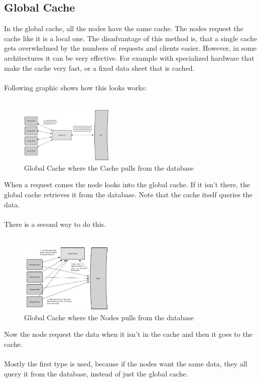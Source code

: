 \documentclass[12p]{article}
\begin{document}
	\subsection{Global Cache}
	In the global cache, all the nodes have the same cache. The nodes request the cache like it is a local one. The disadvantage of this method is, that a single cache gets overwhelmed by the numbers of requests and clients easier. However, in some architectures it can be very effective. For example with specialized hardware that make the cache very fast, or a fixed data sheet that is cached. \\\\
	Following graphic shows how this looks works: \\\\
	\begin{figure}[h!]
		\centering
		\includegraphics[width=0.4\textwidth]{img/global}
		\caption{Global Cache where the Cache pulls from the database \cite{cache}}
	\end{figure}
	When a request comes the node looks into the global cache. If it isn't there, the global cache retrieves it from the database. Note that the cache itself queries the data. \\\\
	There is a second way to do this.\\\\
	\begin{figure}[h!]
		\centering
		\includegraphics[width=0.4\textwidth]{img/global1}
		\caption{Global Cache where the Nodes pulls from the database\cite{cache}}
	\end{figure}
	Now the node request the data when it isn't in the cache and then it goes to the cache.\\\\
	Mostly the first type is used, because if the nodes want the same data, they all query it from the database, instead of just the global cache.
\end{document}
